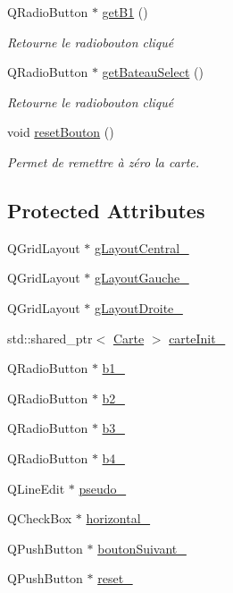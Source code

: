 \begin{DoxyCompactItemize}
Q\+Radio\+Button $\ast$ \hyperlink{classAffichageInit_a79cbb21d4b8b84ad87f13ec7f7fb5224}{get\+B1} ()
\begin{DoxyCompactList}\small\item\em Retourne le radiobouton cliqué \end{DoxyCompactList}\item 
Q\+Radio\+Button $\ast$ \hyperlink{classAffichageInit_a9334010a1147906ffd45dbb48a63ad6e}{get\+Bateau\+Select} ()
\begin{DoxyCompactList}\small\item\em Retourne le radiobouton cliqué \end{DoxyCompactList}\item 
void \hyperlink{classAffichageInit_a55b47fb580a1eb29aa79475453c6936b}{reset\+Bouton} ()
\begin{DoxyCompactList}\small\item\em Permet de remettre à zéro la carte. \end{DoxyCompactList}\end{DoxyCompactItemize}
\subsection*{Protected Attributes}
\begin{DoxyCompactItemize}
\item 
Q\+Grid\+Layout $\ast$ \hyperlink{classAffichageInit_a6cfa8eefd38ed8397269da4b472d7ad5}{g\+Layout\+Central\+\_\+}
\item 
Q\+Grid\+Layout $\ast$ \hyperlink{classAffichageInit_a7e46084cc3c86b029ac04b59f3e70d5e}{g\+Layout\+Gauche\+\_\+}
\item 
Q\+Grid\+Layout $\ast$ \hyperlink{classAffichageInit_a30c6eb873576eb8c416091b3fe54d46a}{g\+Layout\+Droite\+\_\+}
\item 
std\+::shared\+\_\+ptr$<$ \hyperlink{classCarte}{Carte} $>$ \hyperlink{classAffichageInit_ae64aeadaa88e3d7b62c9b8edb77f4bc1}{carte\+Init\+\_\+}
\item 
Q\+Radio\+Button $\ast$ \hyperlink{classAffichageInit_a705aa3459121ac5b4ef60520fb0b509f}{b1\+\_\+}
\item 
Q\+Radio\+Button $\ast$ \hyperlink{classAffichageInit_ac8c97eaabcc52302156b5d0fb2dd4b7f}{b2\+\_\+}
\item 
Q\+Radio\+Button $\ast$ \hyperlink{classAffichageInit_afc2ce79e46033da8e7949f69fee1811c}{b3\+\_\+}
\item 
Q\+Radio\+Button $\ast$ \hyperlink{classAffichageInit_a364a79854751059ea883f4f111416e27}{b4\+\_\+}
\item 
Q\+Line\+Edit $\ast$ \hyperlink{classAffichageInit_a5327093a0df1060ada2be6678a3d2c2e}{pseudo\+\_\+}
\item 
Q\+Check\+Box $\ast$ \hyperlink{classAffichageInit_ad3535a45425dc7a11b8f0ed8c4b07f4c}{horizontal\+\_\+}
\item 
Q\+Push\+Button $\ast$ \hyperlink{classAffichageInit_a2d5808b5c427d934c16b6ffb1046ea1a}{bouton\+Suivant\+\_\+}
\item 
Q\+Push\+Button $\ast$ \hyperlink{classAffichageInit_a057a07eb4c76bde07bf75eb0d7a45f73}{reset\+\_\+}
\end{DoxyCompactItemize}


